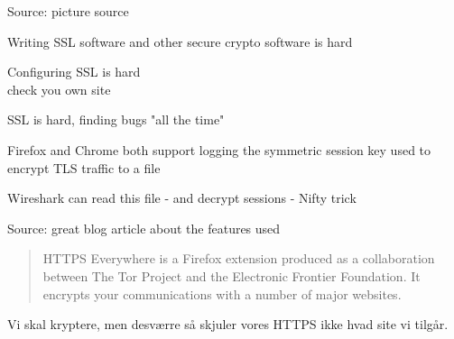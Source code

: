 \documentclass[Screen16to9,17pt]{foils}
\begin{document}

Source: picture source\\ {\footnotesize{}}
\begin{list2}
\item Writing SSL software and other secure crypto software is hard
\item Configuring SSL is hard\\
check you own site 
\item SSL is hard, finding bugs "all the time"
\end{list2}





\begin{list1}
\item  Firefox and Chrome both support logging the symmetric session key used to encrypt TLS traffic to a file
\item Wireshark can read this file - and decrypt sessions - Nifty trick
\end{list1}


Source: great blog article about the features used\\
{\tiny{}}




\begin{quote}
HTTPS Everywhere is a Firefox extension produced as a collaboration between The Tor Project and the Electronic Frontier Foundation. It encrypts your communications with a number of major websites.
\end{quote}

\centerline{}




Vi skal kryptere, men desværre så skjuler vores HTTPS ikke hvad site vi tilgår.
\end{document}
